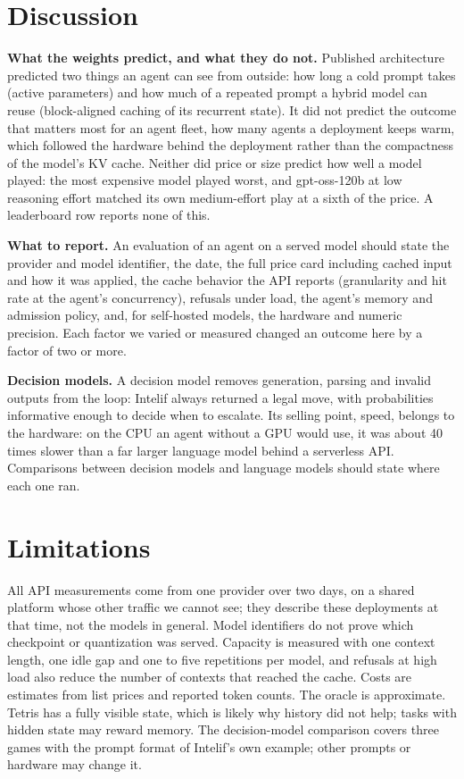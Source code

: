 \documentclass{article}
\begin{document}
\section{Discussion}

\textbf{What the weights predict, and what they do not.} Published architecture predicted two things an agent can see from outside: how long a cold prompt takes (active parameters) and how much of a repeated prompt a hybrid model can reuse (block-aligned caching of its recurrent state). It did not predict the outcome that matters most for an agent fleet, how many agents a deployment keeps warm, which followed the hardware behind the deployment rather than the compactness of the model's KV cache. Neither did price or size predict how well a model played: the most expensive model played worst, and gpt-oss-120b at low reasoning effort matched its own medium-effort play at a sixth of the price. A leaderboard row reports none of this.

\textbf{What to report.} An evaluation of an agent on a served model should state the provider and model identifier, the date, the full price card including cached input and how it was applied, the cache behavior the API reports (granularity and hit rate at the agent's concurrency), refusals under load, the agent's memory and admission policy, and, for self-hosted models, the hardware and numeric precision. Each factor we varied or measured changed an outcome here by a factor of two or more.

\textbf{Decision models.} A decision model removes generation, parsing and invalid outputs from the loop: Intelif always returned a legal move, with probabilities informative enough to decide when to escalate. Its selling point, speed, belongs to the hardware: on the CPU an agent without a GPU would use, it was about 40 times slower than a far larger language model behind a serverless API. Comparisons between decision models and language models should state where each one ran.

\section{Limitations}

All API measurements come from one provider over two days, on a shared platform whose other traffic we cannot see; they describe these deployments at that time, not the models in general. Model identifiers do not prove which checkpoint or quantization was served. Capacity is measured with one context length, one idle gap and one to five repetitions per model, and refusals at high load also reduce the number of contexts that reached the cache. Costs are estimates from list prices and reported token counts. The oracle is approximate. Tetris has a fully visible state, which is likely why history did not help; tasks with hidden state may reward memory. The decision-model comparison covers three games with the prompt format of Intelif's own example; other prompts or hardware may change it.
\end{document}
